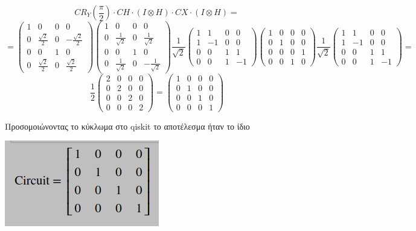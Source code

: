 \documentclass[12pt]{article}
\begin{document}
$$C R_Y(\frac{\pi}{2})\cdot C H \cdot (I \otimes Η)\cdot CX \cdot (I \otimes Η) = $$
$$=\begin{pmatrix}
    1 & 0 & 0&0\\
    0 & \frac{\sqrt{2}}{2} & 0& -\frac{\sqrt{2}}{2}\\
    0 & 0 & 1  & 0\\
    0 & \frac{\sqrt{2}}{2} & 0 & \frac{\sqrt{2}}{2}
\end{pmatrix}\begin{pmatrix}
    1 & 0 & 0&0\\
    0 & \frac{1}{\sqrt{2}} & 0& \frac{1}{\sqrt{2}}\\
    0 & 0 & 1& 0\\
    0 & \frac{1}{\sqrt{2}} & 0& -\frac{1}{\sqrt{2}}
\end{pmatrix}  \frac{1}{\sqrt{2}}\begin{pmatrix}
    1 & 1 & 0&0\\
    1 & -1 & 0& 0\\
    0 & 0 & 1& 1\\
    0 & 0 & 1& -1
\end{pmatrix}
\begin{pmatrix}
    1 & 0 & 0&0\\
    0 & 1 & 0& 0\\
    0 & 0 & 0& 1\\
    0 & 0 & 1& 0
\end{pmatrix} 
\frac{1}{\sqrt{2}}\begin{pmatrix}
    1 & 1 & 0&0\\
    1 & -1 & 0& 0\\
    0 & 0 & 1& 1\\
    0 & 0 & 1& -1
\end{pmatrix}
 = 
 $$
 $$\frac{1}{2}\begin{pmatrix}
    2 & 0 & 0&0\\
    0 & 2 & 0& 0\\
    0 & 0 & 2& 0\\
    0 & 0 & 0& 2
\end{pmatrix}
 = \begin{pmatrix}
    1 & 0 & 0&0\\
    0 & 1 & 0& 0\\
    0 & 0 & 1& 0\\
    0 & 0 & 0& 1
\end{pmatrix}$$

Προσομοιώνοντας το κύκλωμα στο \textlatin{qiskit}
το αποτέλεσμα ήταν το ίδιο
\begin{center}
\includegraphics[]{2022-11-30_03-02.png}
\end{center}
\end{document}
